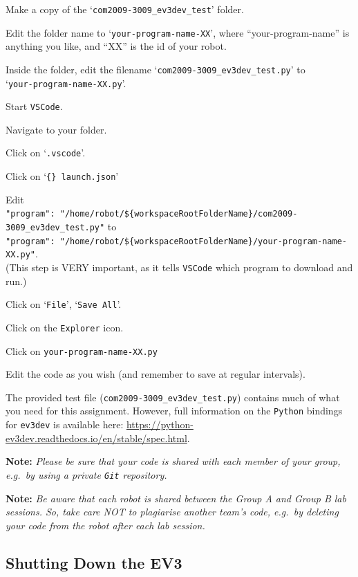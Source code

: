 \documentclass[hidelinks,a4paper,11pt]{article}
\begin{document}
\begin{todolist}
	\item Make a copy of the `\texttt{com2009-3009\_ev3dev\_test}' folder.
	\item Edit the folder name to `\texttt{your-program-name-XX}', where ``your-program-name'' is anything you like, and ``XX'' is the id of your robot.
	\item Inside the folder, edit the filename `\texttt{com2009-3009\_ev3dev\_test.py}' to\\ `\texttt{your-program-name-XX.py}'.
	\item Start \texttt{VSCode}.
	\item Navigate to your folder.
	\item Click on `\texttt{.vscode}'.
	\item Click on `\texttt{\{\} launch.json}'
	\item Edit \\ \texttt{"program":\ "/home/robot/\$\{workspaceRootFolderName\}/com2009-3009\_ev3dev\_test.py"} to \\ \texttt{"program":\ "/home/robot/\$\{workspaceRootFolderName\}/your-program-name-XX.py"}. \\ (This step is VERY important, as it tells \texttt{VSCode} which program to download and run.)
	\item Click on `\texttt{File}', `\texttt{Save All}'.
	\item Click on the \texttt{Explorer} icon.
	\item Click on \texttt{your-program-name-XX.py}
	\item Edit the code as you wish (and remember to save at regular intervals).
\end{todolist}

The provided test file (\texttt{com2009-3009\_ev3dev\_test.py}) contains much of what you need for this assignment.  However, full information on the \texttt{Python} bindings for \texttt{ev3dev} is available here: \url{https://python-ev3dev.readthedocs.io/en/stable/spec.html}.

{\bfseries Note:}  \emph{Please be sure that your code is shared with each member of your group, e.g.\ by using a private \texttt{Git} repository.}

{\bfseries Note:}  \emph{Be aware that each robot is shared between the Group A and Group B lab sessions.  So, take care NOT to plagiarise another team's code, e.g.\ by deleting your code from the robot after each lab session.}


\subsection{Shutting Down the EV3}
\end{document}
